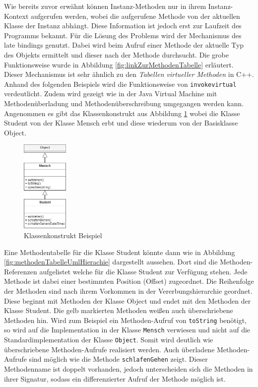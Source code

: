 \documentclass[conference]{IEEEtran}
\begin{document}
Wie bereits zuvor erwähnt können Instanz-Methoden nur in ihrem Instanz-Kontext aufgerufen werden, wobei die aufgerufene Methode von der aktuellen Klasse der Instanz abhängt. Diese Information ist jedoch erst zur Laufzeit des Programms bekannt. Für die Lösung des Problems wird der Mechanismus des late bindings genutzt. Dabei wird beim Aufruf einer Methode der aktuelle Typ des Objekts ermittelt und dieser nach der Methode durchsucht. Die grobe Funktionsweise wurde in Abbildung \ref{fig:linkZurMethodenTabelle} erläutert. Dieser Mechanismus ist sehr ähnlich zu den \textit{Tabellen virtueller Methoden} in C++. Anhand des folgenden Beispiels wird die Funktionsweise von \verb|invokevirtual| verdeutlicht. Zudem wird gezeigt wie in der Java Virtual Machine mit Methodenüberladung und Methodenüberschreibung umgegangen werden kann. Angenommen es gibt das Klassenkonstrukt aus Abbildung \ref{fig:umlHierarchie} wobei die Klasse Student von der Klasse Mensch erbt und diese wiederum von der Basisklasse Object.
\begin{figure}[htbp] 
  \centering
     \includegraphics[width=0.2\textwidth]{Grafiken/UMLHierarchie.png}
  \caption{Klassenkonstrukt Beispiel}
  \label{fig:umlHierarchie}
\end{figure}
Eine Methodentabelle für die Klasse Student könnte dann wie in Abbildung \ref{fig:methodenTabelleUmlHierachie} dargestellt aussehen. Dort sind die Methoden-Referenzen aufgelistet  welche für die Klasse Student zur Verfügung stehen. Jede Methode ist dabei einer bestimmten Position (Offset) zugeordnet. Die Reihenfolge der Methoden sind nach ihrem Vorkommen in der Vererbungshierarchie geordnet. Diese beginnt mit Methoden der Klasse Object und endet mit den Methoden der Klasse Student. Die gelb markierten Methoden weißen auch überschriebene Methoden hin. Wird zum Beispiel ein Methoden-Aufruf von \verb|toString| benötigt, so wird auf die Implementation in der Klasse \verb|Mensch| verwiesen und nicht auf die Standardimplementation der Klasse \verb|Object|. Somit wird deutlich wie überschriebene Methoden-Aufrufe realisiert werden. Auch überladene Methoden-Aufrufe sind möglich wie die Methode \verb|schlafenGehen| zeigt. Dieser Methodenname ist doppelt vorhanden, jedoch unterscheiden sich die Methoden in ihrer Signatur, sodass ein differenzierter Aufruf der Methode möglich ist.\cite{Venners.1999}
\end{document}
